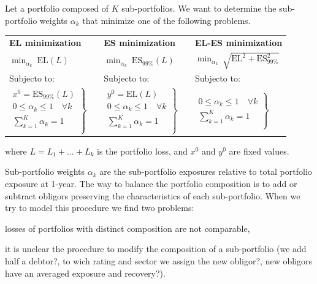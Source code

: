 \documentclass[11pt,fleqn]{book} %
\begin{document}
\begin{definition}
	Let a portfolio composed of $K$ sub-portfolios. We want to determine the 
	sub-portfolio weights $\alpha_k$ that minimize one of the following 
	problems\footnotemark[2].

	{\centering
	\renewcommand{\arraystretch}{1.5}
	\begin{tabular}{l m{1cm} l m{1cm} l}
		\textbf{EL minimization} & & \textbf{ES minimization} & & \textbf{EL-ES minimization} 
		\\
		$\displaystyle \min_{\alpha_k} \ \text{EL}(L)$
		& &
		$\displaystyle \min_{\alpha_k} \ \text{ES}_{99\%}(L)$
		& &
		$\displaystyle \min_{\alpha_k} \ \sqrt{\text{EL}^2+\text{ES}_{99\%}^2}$
		\\
		Subjecto to:
		& &
		Subjecto to:
		& &
		Subjecto to:
		\\
		$\left.
			\begin{array}{l}
				x^0 = \text{ES}_{99\%}(L) \\
				0 \le \alpha_k \le 1 \quad \forall k \\
				\displaystyle \sum_{k=1}^{K} \alpha_k = 1 \\
			\end{array}
			\right\}
		$
		& &
		$\left.
			\begin{array}{l}
				y^0 = \text{EL}(L) \\
				0 \le \alpha_k \le 1 \quad \forall k \\
				\displaystyle \sum_{k=1}^{K} \alpha_k = 1 \\
			\end{array}
			\right\}
		$
		& &
		$\left.
			\begin{array}{l}
				\\
				0 \le \alpha_k \le 1 \quad \forall k \\
				\displaystyle \sum_{k=1}^{K} \alpha_k = 1 \\
			\end{array}
			\right\}
		$
	\end{tabular}\par}
	where $L=L_1+\dots+L_k$ is the portfolio loss, and $x^0$ and $y^0$ are 
	fixed values.
\end{definition}


Sub-portfolio weights $\alpha_k$ are the sub-portfolio exposures relative 
to total portfolio exposure at 1-year. The way to balance the portfolio 
composition is to add or subtract obligors preserving the characteristics 
of each sub-portfolio. When we try to model this procedure we find two 
problems:
\begin{inparaenum}[1)]
	\item losses of portfolios with distinct composition are not comparable, 
	\item it is unclear the procedure to modify the composition of a 
		sub-portfolio (we add half a debtor?, to wich rating and sector we 
		assign the new obligor?, new obligors have an averaged exposure and 
		recovery?).
\end{inparaenum}
\end{document}
